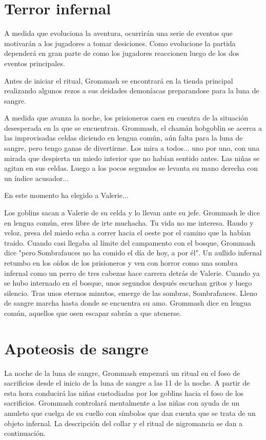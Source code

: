 \documentclass[10pt,twoside,twocolumn,openany]{dndbook}
\begin{document}
\section{Terror infernal}
A medida que evoluciona la aventura, ocurrirán una serie de eventos que motivarán a los jugadores 
a tomar desiciones. Como evolucione la partida dependerá en gran parte de como los jugadores 
reaccionen luego de los dos eventos principales.

Antes de iniciar el ritual, Grommash se encontrará en la tienda principal realizando algunos
rezos a sus deidades demoníacas preparandose para la luna de sangre.

\begin{DndReadAloud}
  A medida que avanza la noche, los prisioneros caen en cuentra de la situación desesperada en la 
  que se encuentran. Grommash, el chamán hobgoblin se acerca a las improvisadas celdas diciendo 
  en lengua común, aún falta para la luna de sangre, pero tengo ganas de divertirme. Los mira a 
  todos... uno por uno, con una mirada que despierta un miedo interior que no habían sentido 
  antes. Las niñas se agitan en sus celdas. Luego a los pocos segundos se levanta su mano derecha 
  con un índice acusador...
\end{DndReadAloud}

En este momento ha elegido a Valerie...

\begin{DndReadAloud}
Los goblins sacan a Valerie de su celda y lo llevan ante su jefe. Grommash le dice en lengua común, 
eres libre de irte muchacha. Tu vida no me interesa. Raudo y veloz, presa del miedo echa a correr 
hacia el oeste por el camino que la habían traido. Cuando casi llegaba al límite del campamento 
con el bosque, Grommash dice "pero Sombrafauces no ha comido el día de hoy, a por él". Un aullido 
infernal retumbo en los oídos de los prisioneros y ven con horror como una sombra infernal como un 
perro de tres cabezas hace carrera detrás de Valerie. Cuando ya se hubo internado en el bosque, unos 
segundos después escuchan gritos y luego silencio. Tras unos eternos minutos, emerge de las 
sombras, Sombrafauces. Lleno de sangre marcha hasta donde se encuentra su amo. Grommash dice en 
lengua común, aquellos que osen escapar sabrán a que atenerse.
\end{DndReadAloud}

\section{Apoteosis de sangre}
La noche de la luna de sangre, Grommash empezará un ritual en el foso de sacrificios desde el 
inicio de la luna de sangre a las 11 de la noche. A partir de esta hora conducirá las niñas 
custodiadas por los goblins hacia el foso de los sacrificios. Grommash controlará mentalmente a 
las niñas con ayuda de un amuleto que cuelga de su cuello con símbolos que dan cuenta que se 
trata de un objeto infernal. La descripción del collar y el ritual de nigromancia se dan a 
continuación.
\end{document}
